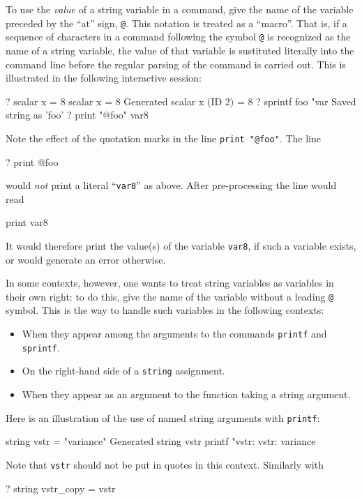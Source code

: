 To use the \emph{value} of a string variable in a command, give the
name of the variable preceded by the ``at'' sign, \verb|@|.  This
notation is treated as a ``macro''.  That is, if a sequence of
characters in a  command following the symbol \verb|@| is
recognized as the name of a string variable, the value of that
variable is sustituted literally into the command line before the
regular parsing of the command is carried out.  This is illustrated in
the following interactive session:
%
\begin{code}
? scalar x = 8
 scalar x = 8
Generated scalar x (ID 2) = 8
? sprintf foo "var%
Saved string as 'foo'
? print "@foo"
var8
\end{code}
%
Note the effect of the quotation marks in the line 
\verb|print "@foo"|.  The line
%
\begin{code}
? print @foo
\end{code}
%
would \textit{not} print a literal ``\texttt{var8}'' as above.  After
pre-processing the line would read
%
\begin{code}
print var8
\end{code}
%
It would therefore print the value(s) of the variable \texttt{var8},
if such a variable exists, or would generate an error otherwise.

In some contexts, however, one wants to treat string variables as
variables in their own right: to do this, give the name of
the variable without a leading \verb|@| symbol.  This is the
way to handle such variables in the following contexts:

\begin{itemize}
\item When they appear among the arguments to the commands \texttt{printf} and
  \texttt{sprintf}.
\item On the right-hand side of a \texttt{string} assignment.
\item When they appear as an argument to the function taking
  a string argument.
\end{itemize}

Here is an illustration of the use of named string arguments with
\texttt{printf}:
%
\begin{code}
string vstr = "variance"
Generated string vstr
printf "vstr: %
vstr:     variance
\end{code}
%
Note that \texttt{vstr} should not be put in quotes in this context.
Similarly with
\begin{code}
? string vstr_copy = vstr
\end{code}

